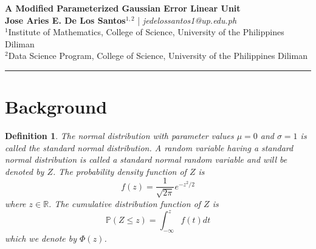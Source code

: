 \documentclass[11pt]{article}
\newtheorem{definition}[theorem]{Definition}
\begin{document}
\begin{center}
{\LARGE \textbf{A Modified Parameterized Gaussian Error Linear Unit} \\[1em]
{\large \textbf{Jose Aries E. De Los Santos}$^{1,2}$ \quad | \quad \textit{jedelossantos1@up.edu.ph}} \\[0.5em]
{\normalsize 
$^1$Institute of Mathematics, College of Science, University of the Philippines Diliman \\
$^2$Data Science Program, College of Science, University of the Philippines Diliman}
}
\end{center}
\hrule \vspace{0.5em}

\section{Background}
\begin{definition}
The normal distribution with parameter values $\mu = 0$ and $\sigma = 1$ is called the standard normal distribution. A random variable having a standard normal distribution is called a standard normal random variable and will be denoted by $Z$. The probability density function of $Z$ is
\begin{equation*}
f(z) = \frac{1}{\sqrt{2\pi}}e^{-z^2/2}
\end{equation*}
where $z \in \mathbb{R}$. The cumulative distribution function of $Z$ is
$$
\mathbb{P}(Z \leq z) = \int_{-\infty}^{z} f(t)dt
$$
which we denote by $\Phi(z)$.
\end{definition}
\end{document}
